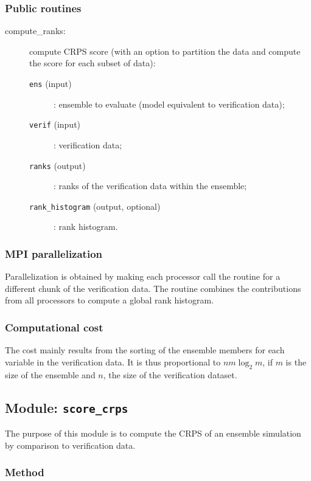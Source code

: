 \documentclass[11pt]{article}
\begin{document}
\subsubsection*{Public routines}

\begin{description}
\item[compute\_ranks:] compute CRPS score (with an option to partition the data
                    and compute the score for each subset of data):
  \begin{description}
  \item[{\tt ens} (input)]: ensemble to evaluate (model equivalent to verification data);
  \item[{\tt verif} (input)]: verification data;
  \item[{\tt ranks} (output)]: ranks of the verification data within the ensemble;
  \item[{\tt rank\_histogram} (output, optional)]: rank histogram.
  \end{description}
\end{description}

\subsubsection*{MPI parallelization}

Parallelization is obtained by making each processor call the routine
for a different chunk of the verification data.
The routine combines the contributions from all processors
to compute a global rank histogram.

\subsubsection*{Computational cost}

The cost mainly results from the sorting of the ensemble members
for each variable in the verification data.
It is thus proportional to $n m \log_2 m$,
if $m$ is the size of the ensemble and $n$, the size of the verification dataset.

\subsection{Module: {\tt\bf score\_crps}}

The purpose of this module is to compute the CRPS
of an ensemble simulation by comparison to verification data.

\subsubsection*{Method}
\end{document}
